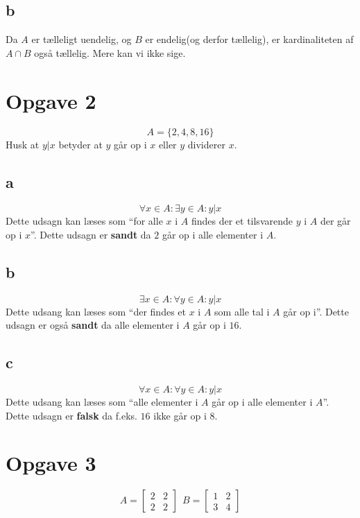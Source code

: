 \documentclass[a4paper,10pt]{article}
\begin{document}
\subsection{b}
Da $A$ er tælleligt uendelig, og $B$ er endelig(og derfor tællelig), er
kardinaliteten af $A \cap B$ også tællelig. Mere kan vi ikke sige.

\section{Opgave 2}
\[ 
    A = \{2, 4, 8, 16\}
\]
Husk at $y|x$ betyder at $y$ går op i $x$ eller $y$ dividerer $x$.
\subsection{a}
\[ 
    \forall x \in A\colon \exists y \in A\colon y|x 
\]
Dette udsagn kan læses som ``for alle $x$ i $A$ findes der et tilsvarende $y$
i $A$ der går op i $x$''. Dette udsagn er \textbf{sandt} da $2$ går op i alle
elementer i $A$.
\subsection{b}
\[ 
    \exists x \in A\colon \forall y \in A\colon y|x 
\]
Dette udsang kan læses som ``der findes et $x$ i $A$ som alle tal i $A$ går op
i''. Dette udsagn er også \textbf{sandt} da alle elementer i $A$ går op i
$16$.
\subsection{c}
\[ 
    \forall x \in A\colon \forall y \in A\colon y|x 
\]
Dette udsang kan læses som ``alle elementer i $A$ går op i alle elementer i
$A$''. Dette udsagn er \textbf{falsk} da f.eks. $16$ ikke går op i $8$. 

\section{Opgave 3}
\[
A = 
\begin{bmatrix}
    2 & 2 \\
    2 & 2 
\end{bmatrix}
\ \ 
B = 
\begin{bmatrix}
    1 & 2 \\
    3 & 4 
\end{bmatrix}
\]
\end{document}
